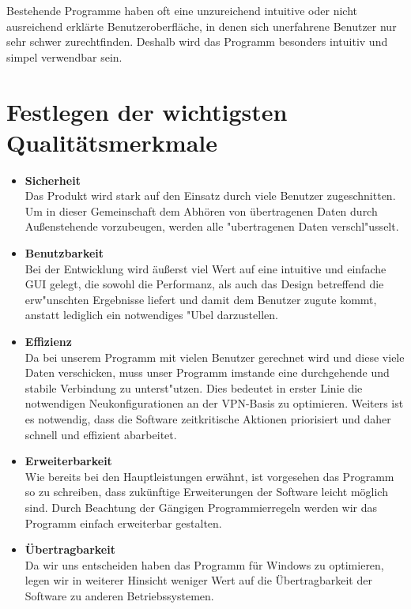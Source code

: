 \documentclass[a4paper,12pt]{scrreprt}
\begin{document}
	Bestehende Programme haben oft eine unzureichend intuitive oder nicht ausreichend erklärte Benutzeroberfläche, in denen sich unerfahrene Benutzer nur sehr schwer zurechtfinden. Deshalb wird das Programm besonders intuitiv und simpel verwendbar sein.
	
	
		
	\section{Festlegen der wichtigsten Qualit\"atsmerkmale}
		\begin{itemize}
			\item {\LARGE\textbf{Sicherheit}}\\
		Das Produkt wird stark auf den Einsatz durch viele Benutzer zugeschnitten. Um in dieser Gemeinschaft dem Abhören von übertragenen Daten durch Außenstehende vorzubeugen, werden alle "ubertragenen Daten verschl"usselt. 
			\item {\LARGE\textbf{Benutzbarkeit}}\\
			Bei der Entwicklung wird äußerst viel Wert auf eine intuitive und einfache GUI gelegt, die sowohl die Performanz, als auch das Design betreffend die erw"unschten Ergebnisse liefert und damit dem Benutzer zugute kommt, anstatt lediglich ein notwendiges "Ubel darzustellen. 
			
			\item {\LARGE\textbf{Effizienz}}\\
		Da bei unserem Programm  mit vielen Benutzer gerechnet wird und diese  viele Daten verschicken, muss unser Programm imstande eine durchgehende und stabile Verbindung zu unterst"utzen. Dies bedeutet in erster Linie die notwendigen Neukonfigurationen an der VPN-Basis zu optimieren. Weiters ist es notwendig, dass die Software zeitkritische Aktionen priorisiert und daher schnell und effizient abarbeitet.
		
		
			\item {\LARGE\textbf{Erweiterbarkeit}}\\
		Wie bereits bei den Hauptleistungen erwähnt, ist vorgesehen das Programm so zu schreiben, dass zukünftige Erweiterungen der Software leicht möglich sind. Durch Beachtung der Gängigen Programmierregeln werden wir das Programm einfach erweiterbar gestalten.
		
			\item {\LARGE\textbf{Übertragbarkeit}}	\\
			Da wir uns entscheiden haben das Programm für Windows zu optimieren, legen wir in weiterer Hinsicht weniger Wert auf die Übertragbarkeit der Software zu anderen Betriebssystemen.
			
			\end{itemize}
\end{document}
